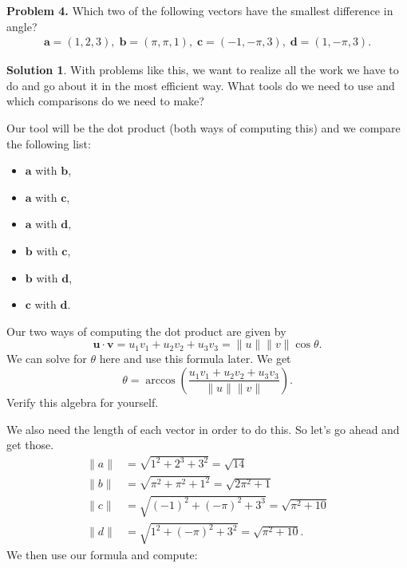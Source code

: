 \documentclass[12pt]{report} %
\theoremstyle{definition}
\newtheorem{solution}{Solution}
\begin{document}
\noindent\textbf{Problem 4.} Which two of the following vectors have the smallest difference in angle?
\begin{align*}
\textbf{a} = (1,2,3),\; \textbf{b} = (\pi,\pi,1),\; \textbf{c} = (-1,-\pi,3),\; \textbf{d} = (1,-\pi,3).
\end{align*}
\begin{solution}
With problems like this, we want to realize all the work we have to do and go about it in the most efficient way.  What tools do we need to use and which comparisons do we need to make? 

Our tool will be the dot product (both ways of computing this) and we compare the following list:
\begin{itemize}
    \item $\mathbf{a}$ with $\mathbf{b}$,
    \item $\mathbf{a}$ with $\mathbf{c}$,
    \item $\mathbf{a}$ with $\mathbf{d}$,
    \item $\mathbf{b}$ with $\mathbf{c}$,
    \item $\mathbf{b}$ with $\mathbf{d}$,
    \item $\mathbf{c}$ with $\mathbf{d}$.
\end{itemize}
Our two ways of computing the dot product are given by
\[
\mathbf{u}\cdot \mathbf{v} = u_1v_1+u_2v_2+u_3v_3 = \|u\|\|v\|\cos \theta.
\]
We can solve for $\theta$ here and use this formula later.  We get
\[
\theta = \arccos\left( \frac{u_1v_1+u_2v_2+u_3v_3}{\|u\|\|v\|}\right).
\]
Verify this algebra for yourself.  

We also need the length of each vector in order to do this.  So let's go ahead and get those.
\begin{align*}
    \|a\|&=\sqrt{1^2+2^3+3^2}=\sqrt{14}\\
    \|b\|&=\sqrt{\pi^2+\pi^2+1^2}=\sqrt{2\pi^2+1}\\
    \|c\|&=\sqrt{(-1)^2+(-\pi)^2+3^3}=\sqrt{\pi^2+10}\\
    \|d\|&=\sqrt{1^2+(-\pi)^2+3^2}=\sqrt{\pi^2+10}.
\end{align*}
We then use our formula and compute:


\end{solution}
\end{document}
